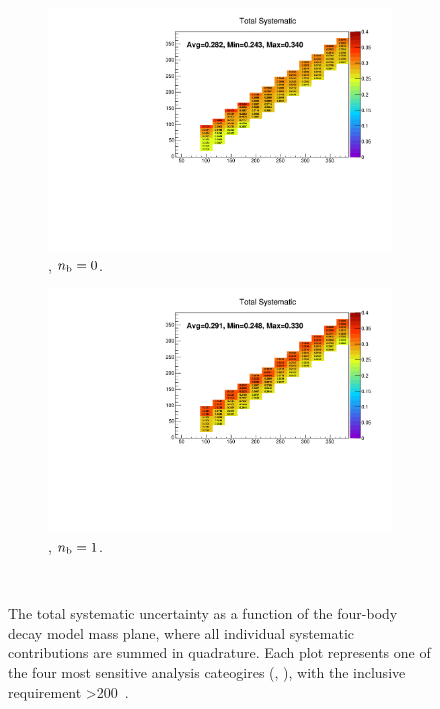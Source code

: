 \begin{figure}[h!]
\begin{subfigure}[b]{0.47\textwidth}
    \includegraphics[width=\textwidth]{Figs/sms/t2degen/v19/systs/total_T2_4body_eq0b_ge4j_incl.pdf}
    \caption{\njhigh, $n_{\text{b}} = 0$.}
  \end{subfigure}
  \begin{subfigure}[b]{0.47\textwidth}
    \includegraphics[width=\textwidth]{Figs/sms/t2degen/v19/systs/total_T2_4body_eq1b_ge4j_incl.pdf}
    \caption{\njhigh, $n_{\text{b}} = 1$.}
  \end{subfigure}\\
  \caption{The total systematic uncertainty as a function of the four-body decay
  model mass plane,
  where all individual systematic contributions are summed in quadrature.
  Each plot represents one of the four most sensitive 
  analysis cateogires (\nb, \nj), with the inclusive requirement \HT>200~\gev.}
  \label{fig:sms-totalsyst-t2degen}
\end{figure}
